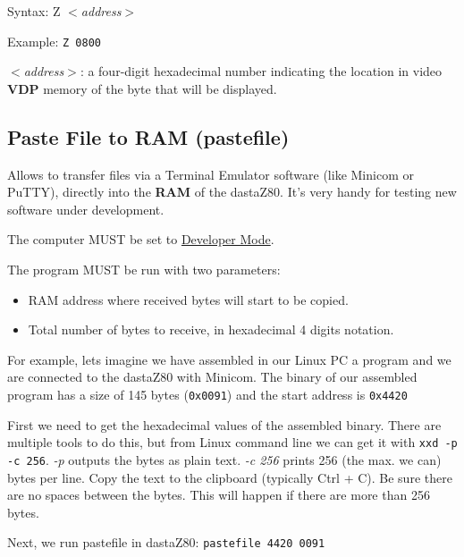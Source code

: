        Syntax: Z \textit{$<$address$>$}

        Example: \texttt{Z 0800}

        \hspace{1cm}\textit{$<$address$>$}: a four-digit hexadecimal number
        indicating the location in video \textbf{VDP} memory of the byte that
        will be displayed.

    \subsection{Paste File to RAM (pastefile)}
    \label{software:pastefile}

    Allows to transfer files via a Terminal Emulator software (like Minicom or
    PuTTY), directly into the \textbf{RAM} of the dastaZ80. It's very handy for
    testing new software under
    development.

    The computer MUST be set to \hyperref[subsec:devmode]{Developer Mode}.

    The program MUST be run with two parameters:

    \begin{itemize}
        \item RAM address where received bytes will start to be copied.
        \item Total number of bytes to receive, in hexadecimal 4 digits notation.
    \end{itemize}

    For example, lets imagine we have assembled in our Linux PC a program and
    we are connected to the dastaZ80 with Minicom. The binary of our assembled
    program has a size of 145 bytes (\texttt{0x0091}) and the start address is
    \texttt{0x4420}

    First we need to get the hexadecimal values of the assembled binary. There
    are multiple tools to do this, but from Linux command line we can get it
    with \texttt{xxd -p -c 256}. \textit{-p} outputs the bytes as plain text.
    \textit{-c 256} prints 256 (the max. we can) bytes per line. Copy the text
    to the clipboard (typically Ctrl + C). Be sure there are no spaces between
    the bytes. This will happen if there are more than 256 bytes.

    Next, we run pastefile in dastaZ80: \texttt{pastefile 4420 0091}

